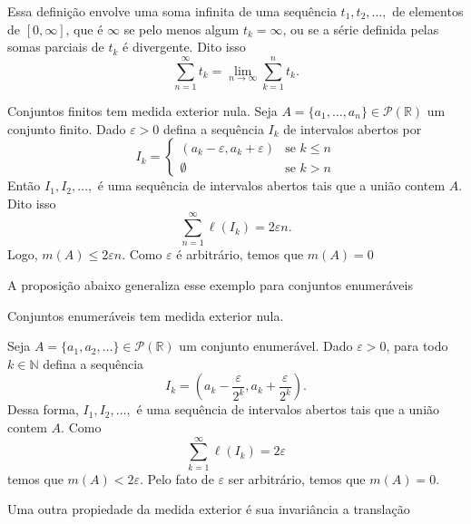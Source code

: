\documentclass[a4paper, 11pt]{book}
\theoremstyle{definition}
\newcommand{\bN}{\mathbb{N}}
\newcommand{\bR}{\mathbb{R}}
\newcommand{\cP}{\mathcal{P}}
\begin{document}
Essa definição envolve uma soma infinita de uma sequência $t_1,t_2,\dots,$ de elementos de $[0,\infty]$, que é $\infty$ se pelo menos algum $t_k = \infty$, ou se a série definida pelas somas parciais de $t_k$ é divergente. Dito isso
\[
    \sum_{n=1}^{\infty} t_k = \lim_{n\to\infty} \sum_{k=1}^{n} t_k.
\]

\begin{ex}
    Conjuntos finitos tem medida exterior nula.
    Seja $A = \{a_1,\dots,a_n\} \in \cP(\bR)$ um conjunto finito.
    Dado $\varepsilon > 0$ defina a sequência $I_k$ de intervalos abertos por
    \[
        I_k =
        \left\{
            \begin{array}{ll}
                (a_k - \varepsilon, a_k + \varepsilon) &\text{se } k \leqslant n\\
                \emptyset &\text{se } k > n
            \end{array}
        \right.
    \]
    Então $I_1, I_2,\dots,$ é uma sequência de intervalos abertos tais que a união contem $A$. Dito isso
    \[
        \sum_{n=1}^{\infty} \ell(I_k) = 2\varepsilon n.
    \]
    Logo, $m(A) \leqslant 2\varepsilon n$.
    Como $\varepsilon$ é arbitrário, temos que $m(A) = 0$
\end{ex}

A proposição abaixo generaliza esse exemplo para conjuntos enumeráveis

\begin{pbox}
    Conjuntos enumeráveis tem medida exterior nula.
\end{pbox}
\begin{prf}
    Seja $A = \{a_1,a_2,\dots\} \in \cP(\bR)$ um conjunto enumerável. Dado $\varepsilon > 0$, para todo $k \in \bN$ defina a sequência
    \[
        I_k = \left( a_k - \frac{\varepsilon}{2^k}, a_k + \frac{\varepsilon}{2^k} \right).
    \]
    Dessa forma, $I_1,I_2,\dots,$ é uma sequência de intervalos abertos tais que a união contem $A$.
    Como
    \[
        \sum_{k=1}^{\infty} \ell(I_k) = 2\varepsilon
    \]
    temos que $m(A) < 2\varepsilon$.
    Pelo fato de $\varepsilon$ ser arbitrário, temos que $m(A) = 0$.
\end{prf}

Uma outra propiedade da medida exterior é sua invariância a translação
\end{document}
